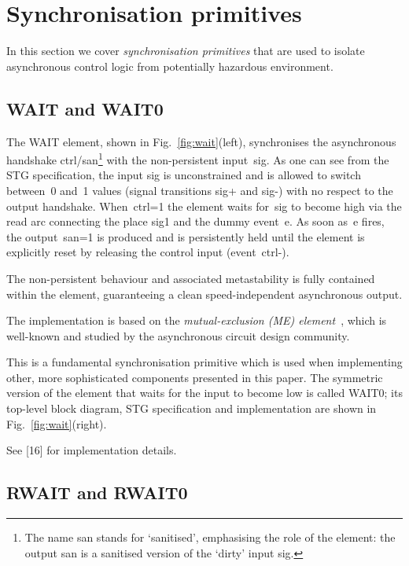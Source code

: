 \documentclass[conference]{IEEEtran}
\begin{document}
\section{Synchronisation primitives}

In this section we cover \emph{synchronisation primitives} that are used to
isolate asynchronous control logic from potentially hazardous environment.

\subsection{\textsf{WAIT} and \textsf{WAIT0}}

The \textsf{WAIT} element, shown in Fig.~\ref{fig:wait}(left), synchronises the
asynchronous handshake \textsf{ctrl/san}\footnote{The name \textsf{san} stands
for `sanitised', emphasising the role of the element: the output \textsf{san}
is a sanitised version of the `dirty' input \textsf{sig}.} with the
non-persistent input~\textsf{sig}. As one can see from the STG specification,
the input \textsf{sig} is unconstrained and is allowed to switch between~0 and~1
values (signal transitions \textsf{sig+} and \textsf{sig-}) with no respect to
the output handshake.
When~\textsf{ctrl=1} the element waits for~\textsf{sig} to become high via the
read arc connecting the place \textsf{sig1} and the dummy event~\textsf{e}. As
soon as~\textsf{e} fires, the output~\textsf{san=1} is produced and is
persistently held until the element is explicitly reset by releasing the
control input (event~\textsf{ctrl-}).

The non-persistent behaviour and associated metastability is fully contained
within the element, guaranteeing a clean speed-independent asynchronous output.

The implementation is based on the \emph{mutual-exclusion (ME)
element}~\cite{2008_kinniment_synchronisation}, which is well-known and studied
by the asynchronous circuit design community.

This is a fundamental synchronisation primitive which is used when
implementing other, more sophisticated components presented in this paper.
The symmetric version of the element that waits for the input to become low is
called \textsf{WAIT0}; its top-level block diagram, STG specification and
implementation are shown in Fig.~\ref{fig:wait}(right).

See [16] for implementation details.

\subsection{RWAIT and RWAIT0}
\end{document}
